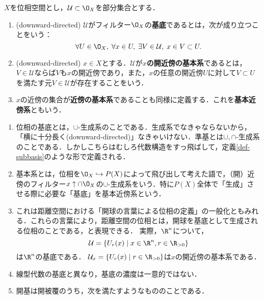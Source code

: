 \documentclass[uplatex,dvipdfmx]{jsreport}
\begin{document}
\begin{definition}\label{def-basis-fundamental-sysmte}
    $X$を位相空間とし，$\mathcal{U}\subset\O_X$を部分集合とする．
    \begin{enumerate}
        \item (downward-directed) $\mathcal{U}$がフィルター$\O_X$の\textbf{基底}であるとは，次が成り立つことをいう：\[\forall U\in\O_X,\;\forall x\in U,\; \exists V\in\mathcal{U},\;x\in V\subset U.\]
        \item (downward-directed) $x\in X$とする．$\mathcal{U}$が\textbf{$x$の開近傍の基本系}であるとは，$V\in\mathcal{U}$ならば$V$も$x$の開近傍であり，また，$x$の任意の開近傍$U$に対して$V\subset U$を満たす元$V\in\mathcal{U}$が存在することをいう．
        \item $x$の近傍の集合が\textbf{近傍の基本系}であることも同様に定義する．これを\textbf{基本近傍系}ともいう．
    \end{enumerate}
\end{definition}
\begin{remark}\mbox{}
    \begin{enumerate}
        \item 位相の基底とは，$\cup$-生成系のことである．生成系でなきゃならないから，「横に十分長く(downward-directed)」なきゃいけない．準基とは$\cup,\cap$-生成系のことである．しかしこちらはむしろ代数構造をすっ飛ばして，定義\ref{def-subbasis}のような形で定義される．
        \item 基本系とは，位相を$\O_X\hookrightarrow P(X)$によって飛び出して考えた語で，（開）近傍のフィルター$x\uparrow\cap\O_X$の$\cup$-生成系をいう．特に$P(X)$全体で「生成」させる際に必要な「基底」を基本近傍系という．
        \item これは距離空間における「開球の言葉による位相の定義」の一般化ともみれる．これらの言葉により，距離空間の位相とは，開球を基底として生成される位相のことである，と表現できる．
        実際，$\R^n$について，\[\mathcal{U}=\{U_r(x)\mid x\in\R^n,r\in\R_{>0}\}\]は$\R^n$の基底である．
        $\mathcal{U}_x=\{U_r(x)\mid r\in\R_{>0}\}$は$x$の開近傍の基本系である．
        \item 線型代数の基底と異なり，基底の濃度は一意的ではない．
        \item 開基は開被覆のうち，次を満たすようなもののことである．
    \end{enumerate}
\end{remark}
\end{document}
